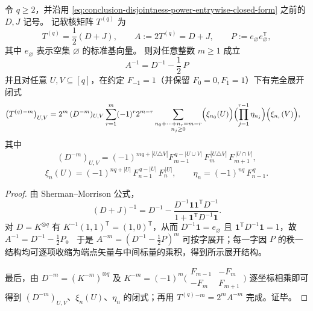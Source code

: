 \begin{theorem}\label{thm:conclusion-softcore-inverse-power-entrywise}
令 \(q\ge 2\)，并沿用 \eqref{eq:conclusion-disjointness-power-entrywise-closed-form} 之前的 \(D,J\) 记号。
记软核矩阵 \(T^{(q)}\) 为
\[
T^{(q)}=\frac12(D+J),
\qquad
A:=2T^{(q)}=D+J,
\qquad
P:=e_{\varnothing}e_{\varnothing}^{\mathsf T},
\]
其中 \(e_{\varnothing}\) 表示空集 \(\varnothing\) 的标准基向量。
则对任意整数 \(m\ge 1\) 成立
\[
\boxed{\;A^{-1}=D^{-1}-\frac12\,P\;}
\]
并且对任意 \(U,V\subseteq[q]\)，在约定 \(F_{-1}=1\)（并保留 \(F_0=0,F_1=1\)）下有完全展开闭式
\begin{align*}
\bigl(T^{(q)}{}^{-m}\bigr)_{U,V}
&=
2^{m}\,(D^{-m})_{U,V}
\sum_{r=1}^{m}(-1)^{r}2^{m-r}
\sum_{\substack{n_0+\cdots+n_r=m-r\\ n_j\ge 0}}
\Bigl(\xi_{n_0}(U)\Bigr)\Bigl(\prod_{j=1}^{r-1}\eta_{n_j}\Bigr)\Bigl(\xi_{n_r}(V)\Bigr),
\end{align*}
其中
\[
(D^{-m})_{U,V}=(-1)^{mq+|U\triangle V|}
F_{m-1}^{\,q-|U\cup V|}\,F_{m}^{\,|U\triangle V|}\,F_{m+1}^{\,|U\cap V|},
\]
\[
\xi_n(U)=(-1)^{nq+|U|}\,F_{n-1}^{\,q-|U|}\,F_{n}^{\,|U|},
\qquad
\eta_n=(-1)^{nq}\,F_{n-1}^{\,q}.
\]
\end{theorem}
\begin{proof}
由 Sherman--Morrison 公式，
\[
(D+J)^{-1}=D^{-1}-\frac{D^{-1}\mathbf 1\mathbf 1^{\mathsf T}D^{-1}}{1+\mathbf 1^{\mathsf T}D^{-1}\mathbf 1}.
\]
对 \(D=K^{\otimes q}\) 有 \(K^{-1}(1,1)^{\mathsf T}=(1,0)^{\mathsf T}\)，从而 \(D^{-1}\mathbf 1=e_{\varnothing}\) 且 \(\mathbf 1^{\mathsf T}D^{-1}\mathbf 1=1\)，故 \(A^{-1}=D^{-1}-\frac12P\)。
于是 \(A^{-m}=(D^{-1}-\tfrac12P)^m\) 可按字展开；每一字因 \(P\) 的秩一结构均可逐项收缩为端点矢量与中间标量的乘积，得到所示展开结构。
\par
最后，由 \(D^{-m}=(K^{-m})^{\otimes q}\) 及
\(
K^{-m}=(-1)^m\bigl(\begin{smallmatrix}F_{m-1}&-F_m\\[2pt]-F_m&F_{m+1}\end{smallmatrix}\bigr)
\)
逐坐标相乘即可得到 \((D^{-m})_{U,V}\)、\(\xi_n(U)\)、\(\eta_n\) 的闭式；再用 \(T^{(q)}{}^{-m}=2^{m}A^{-m}\) 完成。证毕。
\end{proof}

\endinput
